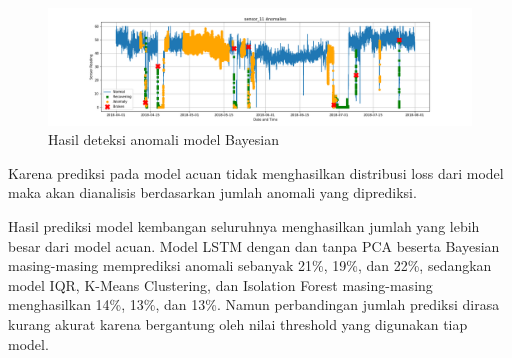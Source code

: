     \begin{figure}[h]
        \centerline{\includegraphics[width=1.4\textwidth]{resources/Bayes/Bayes_sensor_11.png}}
        \caption{Hasil deteksi anomali model Bayesian}
    \end{figure}

    Karena prediksi pada model acuan tidak menghasilkan distribusi loss dari model maka akan dianalisis berdasarkan jumlah anomali yang diprediksi.

    Hasil prediksi model kembangan seluruhnya menghasilkan jumlah yang lebih besar dari model acuan. Model LSTM dengan dan tanpa PCA beserta Bayesian masing-masing memprediksi anomali sebanyak 21\%, 19\%, dan 22\%, sedangkan model IQR, K-Means Clustering, dan Isolation Forest masing-masing menghasilkan 14\%, 13\%, dan 13\%. Namun perbandingan jumlah prediksi dirasa kurang akurat karena bergantung oleh nilai threshold yang digunakan tiap model.
